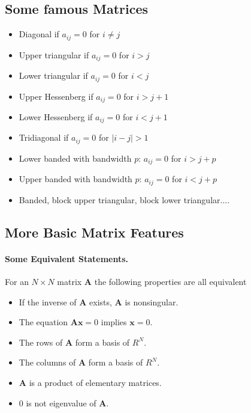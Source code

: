 \documentclass[%
oneside,                 %
final,                   %
10pt]{article}
\begin{document}
\noindent



\subsection{Some famous Matrices}

\begin{itemize}
  \item Diagonal if $a_{ij}=0$ for $i\ne j$

  \item Upper triangular if $a_{ij}=0$ for $i > j$

  \item Lower triangular if $a_{ij}=0$ for $i < j$

  \item Upper Hessenberg if $a_{ij}=0$ for $i > j+1$

  \item Lower Hessenberg if $a_{ij}=0$ for $i < j+1$

  \item Tridiagonal if $a_{ij}=0$ for $|i -j| > 1$

  \item Lower banded with bandwidth $p$: $a_{ij}=0$ for $i > j+p$

  \item Upper banded with bandwidth $p$: $a_{ij}=0$ for $i < j+p$

  \item Banded, block upper triangular, block lower triangular....
\end{itemize}

\noindent
\subsection{More Basic Matrix Features}


\paragraph{Some Equivalent Statements.}
For an $N\times N$ matrix  $\mathbf{A}$ the following properties are all equivalent

\begin{itemize}
  \item If the inverse of $\mathbf{A}$ exists, $\mathbf{A}$ is nonsingular.

  \item The equation $\mathbf{Ax}=0$ implies $\mathbf{x}=0$.

  \item The rows of $\mathbf{A}$ form a basis of $R^N$.

  \item The columns of $\mathbf{A}$ form a basis of $R^N$.

  \item $\mathbf{A}$ is a product of elementary matrices.

  \item $0$ is not eigenvalue of $\mathbf{A}$.
\end{itemize}
\end{document}
